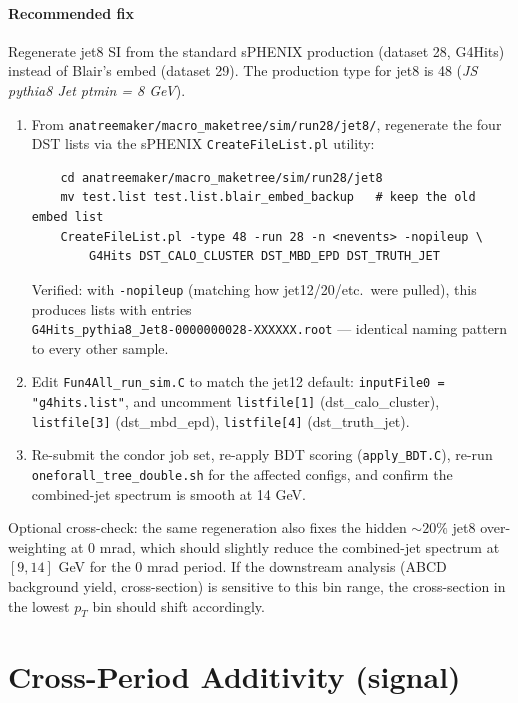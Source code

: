 \documentclass[11pt,a4paper]{article}
\begin{document}
\paragraph{Recommended fix} Regenerate jet8 SI from the standard sPHENIX production (dataset 28, G4Hits) instead of Blair's embed (dataset 29). The production type for jet8 is 48 (\emph{JS pythia8 Jet ptmin = 8 GeV}).

\begin{enumerate}
  \item From \texttt{anatreemaker/macro\_maketree/sim/run28/jet8/}, regenerate the four DST lists via the sPHENIX \texttt{CreateFileList.pl} utility:
  \begin{verbatim}
    cd anatreemaker/macro_maketree/sim/run28/jet8
    mv test.list test.list.blair_embed_backup   # keep the old embed list
    CreateFileList.pl -type 48 -run 28 -n <nevents> -nopileup \
        G4Hits DST_CALO_CLUSTER DST_MBD_EPD DST_TRUTH_JET
  \end{verbatim}
  Verified: with \texttt{-nopileup} (matching how jet12/20/etc.\ were pulled), this produces lists with entries\\
  \texttt{G4Hits\_pythia8\_Jet8-0000000028-XXXXXX.root} --- identical naming pattern to every other sample.
  \item Edit \texttt{Fun4All\_run\_sim.C} to match the jet12 default: \texttt{inputFile0 = "g4hits.list"}, and uncomment \texttt{listfile[1]} (dst\_calo\_cluster), \texttt{listfile[3]} (dst\_mbd\_epd), \texttt{listfile[4]} (dst\_truth\_jet).
  \item Re-submit the condor job set, re-apply BDT scoring (\texttt{apply\_BDT.C}), re-run \texttt{oneforall\_tree\_double.sh} for the affected configs, and confirm the combined-jet spectrum is smooth at 14 GeV.
\end{enumerate}
Optional cross-check: the same regeneration also fixes the hidden $\sim 20\%$ jet8 over-weighting at 0 mrad, which should slightly reduce the combined-jet spectrum at $[9, 14]$ GeV for the 0 mrad period. If the downstream analysis (ABCD background yield, cross-section) is sensitive to this bin range, the cross-section in the lowest $p_T$ bin should shift accordingly.

\section{Cross-Period Additivity (signal)}
\label{sec:additivity}
\end{document}
